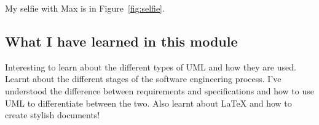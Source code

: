  My selfie with Max is in  Figure~\ref{fig:selfie}.

\subsection{What I have learned in this module}
Interesting to learn about the different types of UML and how they are used. Learnt about the different stages of the software engineering process. I've understood the difference between requirements and specifications and how to use UML to differentiate between the two. Also learnt about LaTeX and how to create stylish documents!

